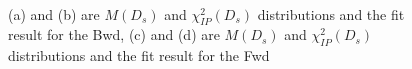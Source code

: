 \documentclass[
10pt, %
a4paper, %
oneside, %
headinclude,footinclude, %
BCOR5mm, %
]{scrartcl}
\begin{document}
\begin{comment}
\begin{description}
\item[Word] Definition
\item[Concept] Explanation
\item[Idea] Text
\end{description}



\begin{itemize}[noitemsep] %
\item First item in a list
\item Second item in a list
\item Third item in a list
\end{itemize}



\begin{table}[hbt]
\caption{Table of Grades}
\centering
\begin{tabular}{llr}
\toprule
\multicolumn{2}{c}{Name} \\
\cmidrule(r){1-2}
First name & Last Name & Grade \\
\midrule
 &  & $7.5$ \\
 &  & $2$ \\
\bottomrule
\end{tabular}
\label{tab:label}
\end{table}

Reference to Table~\vref{tab:label}. %
\end{comment}



\begin{figure}[tb]
\centering
{} \quad
{} \\
 \quad
{}
\caption[Mass and $\chi^2_{IP}(D_s)$ fits ]{(a) and (b) are $M(D_s)$ and $\chi^2_{IP}(D_s)$ distributions and the fit result for the Bwd, (c) and (d) are $M(D_s)$ and $\chi^2_{IP}(D_s)$ distributions and the fit result for the Fwd} %
\label{fig:esempio}
\end{figure}
\end{document}
